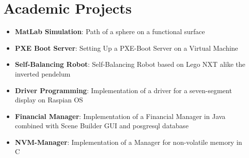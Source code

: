 \documentclass[letterpaper,10.8pt]{article}
\newcommand{\resumeItem}[2]{
  \item\small{
    \textbf{#1}{: #2 \vspace{-2pt}}
  }
}
\newcommand{\resumeSubItem}[2]{\resumeItem{#1}{#2}\vspace{-4pt}}
\newcommand{\resumeSubHeadingListStart}{\begin{itemize}[leftmargin=*]}
\newcommand{\resumeSubHeadingListEnd}{\end{itemize}}
\begin{document}
\section{Academic Projects}
\resumeSubHeadingListStart
\resumeSubItem{MatLab Simulation}{Path of a sphere on a functional surface}
\resumeSubItem{PXE Boot Server}{Setting Up a PXE-Boot Server on a Virtual Machine}
\resumeSubItem{Self-Balancing Robot}{Self-Balancing Robot based on Lego NXT alike the inverted pendelum}
\resumeSubItem{Driver Programming}{Implementation of a  driver for a seven-segment display on Raspian OS}
\resumeSubItem{Financial Manager}{Implementation of a Financial Manager in Java combined with Scene Builder GUI and posgresql database}
\resumeSubItem{NVM-Manager}{Implementation of a Manager for non-volatile memory in C}
\resumeSubHeadingListEnd





\end{document}
